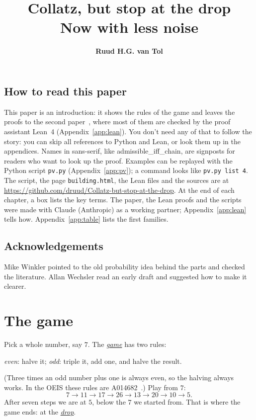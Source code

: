 \documentclass[10pt,a4paper,titlepage]{article}
\title{\textbf{Collatz, but stop at the drop}\\[0.5ex]
  \Large Now with less noise}
\author{\textbf{Ruud H.G. van Tol}}
\date{Preprint, October 2026\\[8ex]
  \begin{tikzpicture}[scale=0.9]\dropchordsXXVII\end{tikzpicture}\\[6ex]
  {\small \copyright\ 2026 Ruud H.G. van Tol. Licensed under \href{https://creativecommons.org/licenses/by/4.0/}{CC BY 4.0}.\\
  DOI \href{https://doi.org/10.5281/zenodo.23631044}{10.5281/zenodo.23631044}}}
\makeatletter
\newcommand{\termhere}[1]{\leavevmode
  \Hy@raisedlink{\hyper@anchorstart{term:#1}\hyper@anchorend}}
\newcommand{\keyterm}[2]{\hyperlink{box:#1}{\emph{#2}}}
\newcommand{\lean}[1]{\textsf{#1}}
\newcommand{\pv}[1]{\texttt{pv.py #1}}
\makeatother
\begin{document}
\maketitle

\subsection*{How to read this paper}

This paper is an introduction: it shows the rules of the game and leaves the proofs
to the second paper~\cite{Paper2}, where most of them are checked by the proof
assistant Lean~4 (Appendix~\ref{app:lean}). You don't need any of that to follow the
story: you can skip all references to Python and Lean, or look them up in the
appendices. Names in sans-serif, like \lean{admissible\_iff\_chain}, are signposts for
readers who want to look up the proof. Examples can be replayed with the Python script
\texttt{pv.py} (Appendix~\ref{app:pv}); a command looks like \pv{list 4}. The script, the
page \texttt{building.html}, the Lean files and the sources are at
\url{https://github.com/druud/Collatz-but-stop-at-the-drop}. At the end
of each chapter, a box lists the key terms. The paper, the Lean proofs and the
scripts were made with Claude (Anthropic) as a working partner;
Appendix~\ref{app:lean} tells how. Appendix~\ref{app:table} lists the first families.

\subsection*{Acknowledgements}

Mike Winkler pointed to the old probability idea behind the parts and checked
the literature. Allan Wechsler read an early draft and suggested how to make it
clearer.

\section{The game}
\label{sec:intro}

\termhere{game}Pick a whole number, say $7$. The \keyterm{game}{game} has two rules:
\begin{center}
\emph{even}: halve it; \quad \emph{odd}: triple it, add one, and halve the result.
\end{center}
(Three times an odd number plus one is always even, so the halving always works.
In the OEIS these rules are A014682~\cite{OEIS_A014682}.)
Play from $7$:
\[
7 \to 11 \to 17 \to 26 \to 13 \to 20 \to 10 \to 5 .
\]
\termhere{drop}After seven steps we are at $5$, below the $7$ we started from. That is where the
game ends: at the \keyterm{drop}{drop}.
\end{document}
